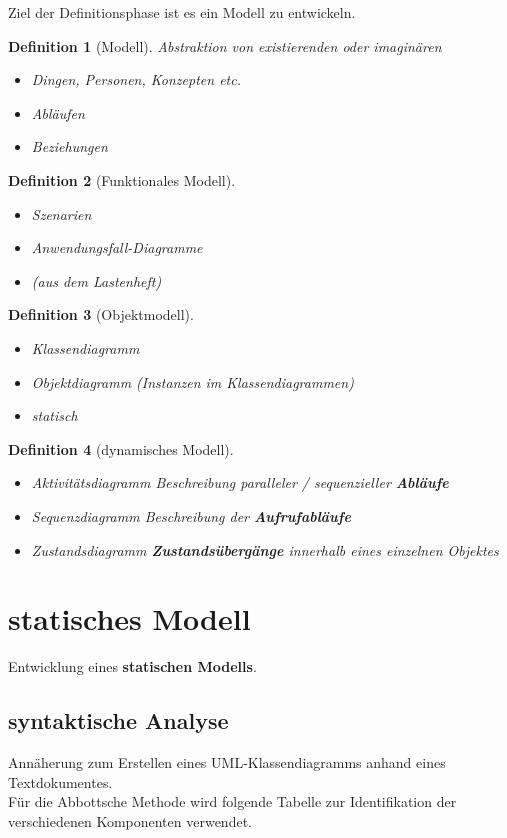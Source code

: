\documentclass[a4paper]{article}
\theoremstyle{break}
\newtheorem{defi}{Definition}[section]
\begin{document}
Ziel der Definitionsphase ist es ein Modell zu entwickeln. 

\begin{defi}[Modell]
	Abstraktion von existierenden oder imaginären
	\begin{itemize}
		\item Dingen, Personen, Konzepten etc.
		\item Abläufen
		\item Beziehungen
	\end{itemize}

\end{defi}

\begin{defi}[Funktionales Modell]
	\begin{itemize}
		\item Szenarien
		\item Anwendungsfall-Diagramme
		\item (aus dem Lastenheft)
	\end{itemize}
	
\end{defi} 
\begin{defi}[Objektmodell]
	\begin{itemize}
		\item Klassendiagramm
		\item Objektdiagramm (Instanzen im Klassendiagrammen)
		\item statisch
	\end{itemize}
\end{defi}
\begin{defi}[dynamisches Modell]
	\begin{itemize}
	\item Aktivitätsdiagramm
	\subitem Beschreibung paralleler / sequenzieller \textbf{Abläufe}
	\item Sequenzdiagramm
	\subitem Beschreibung der \textbf{Aufrufabläufe}
	\item Zustandsdiagramm
	\subitem \textbf{Zustandsübergänge} innerhalb eines einzelnen Objektes
\end{itemize}
\end{defi} 

\section{statisches Modell}
Entwicklung eines \textbf{statischen Modells}. 
\subsection{syntaktische Analyse}
Annäherung zum Erstellen eines UML-Klassendiagramms anhand eines Textdokumentes.\\
Für die Abbottsche Methode wird folgende Tabelle zur Identifikation der verschiedenen Komponenten verwendet.\\
	
\end{document}
